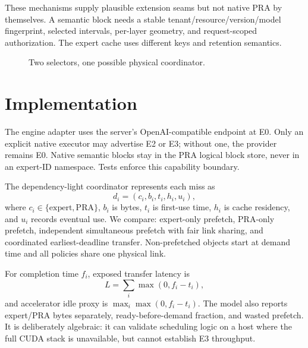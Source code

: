 \documentclass[10pt]{article}
\begin{document}
These mechanisms supply plausible extension seams but not native PRA by
themselves. A semantic block needs a stable tenant/resource/version/model
fingerprint, selected intervals, per-layer geometry, and request-scoped
authorization. The expert cache uses different keys and retention semantics.

\begin{figure}[t]
\centering
{}
\caption{Two selectors, one possible physical coordinator.}
\label{fig:architecture}
\end{figure}

\section{Implementation}
The engine adapter uses the server's OpenAI-compatible endpoint at E0. Only an
explicit native executor may advertise E2 or E3; without one, the provider
remains E0. Native semantic blocks stay in the PRA logical block store, never
in an expert-ID namespace. Tests enforce this capability boundary.

The dependency-light coordinator represents each miss as
\begin{equation}
 d_i=(c_i,b_i,t_i,h_i,u_i),
\end{equation}
where $c_i\in\{\text{expert},\text{PRA}\}$, $b_i$ is bytes, $t_i$ is first-use
time, $h_i$ is cache residency, and $u_i$ records eventual use. We compare:
expert-only prefetch, PRA-only prefetch, independent simultaneous prefetch with
fair link sharing, and coordinated earliest-deadline transfer. Non-prefetched
objects start at demand time and all policies share one physical link.

For completion time $f_i$, exposed transfer latency is
\begin{equation}
 L=\sum_i\max(0,f_i-t_i),
\end{equation}
and accelerator idle proxy is $\max_i\max(0,f_i-t_i)$. The model also reports
expert/PRA bytes separately, ready-before-demand fraction, and wasted prefetch.
It is deliberately algebraic: it can validate scheduling logic on a host where
the full CUDA stack is unavailable, but cannot establish E3 throughput.
\end{document}
